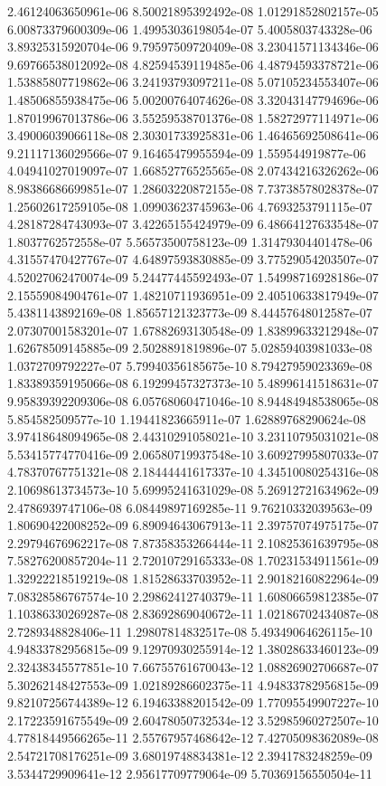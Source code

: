 2.46124063650961e-06	8.50021895392492e-08	1.01291852802157e-05	6.00873379600309e-06	1.49953036198054e-07	5.4005803743328e-06	3.89325315920704e-06	9.79597509720409e-08	3.23041571134346e-06	9.69766538012092e-08	4.82594539119485e-06	4.48794593378721e-06
1.53885807719862e-06	3.24193793097211e-08	5.07105234553407e-06	1.48506855938475e-06	5.00200764074626e-08	3.32043147794696e-06	1.87019967013786e-06	3.55259538701376e-08	1.58272977114971e-06	3.49006039066118e-08	2.30301733925831e-06	1.46465692508641e-06
9.21117136029566e-07	9.16465479955594e-09	1.559544919877e-06	4.04941027019097e-07	1.66852776525565e-08	2.07434216326262e-06	8.98386686699851e-07	1.28603220872155e-08	7.73738578028378e-07	1.25602617259105e-08	1.09903623745963e-06	4.7693253791115e-07
4.28187284743093e-07	3.42265155424979e-09	6.48664127633548e-07	1.8037762572558e-07	5.56573500758123e-09	1.31479304401478e-06	4.31557470427767e-07	4.64897593830885e-09	3.77529054203507e-07	4.52027062470074e-09	5.24477445592493e-07	1.54998716928186e-07
2.15559084904761e-07	1.48210711936951e-09	2.40510633817949e-07	5.4381143892169e-08	1.85657121323773e-09	8.44457648012587e-07	2.07307001583201e-07	1.67882693130548e-09	1.83899633212948e-07	1.62678509145885e-09	2.5028891819896e-07	5.02859403981033e-08
1.0372709792227e-07	5.79940356185675e-10	8.79427959023369e-08	1.83389359195066e-08	6.19299457327373e-10	5.48996141518631e-07	9.95839392209306e-08	6.05768060471046e-10	8.94484948538065e-08	5.854582509577e-10	1.19441823665911e-07	1.62889768290624e-08
3.97418648094965e-08	2.44310291058021e-10	3.23110795031021e-08	5.53415774770416e-09	2.06580719937548e-10	3.60927995807033e-07	4.78370767751321e-08	2.18444441617337e-10	4.34510080254316e-08	2.10698613734573e-10	5.69995241631029e-08	5.26912721634962e-09
2.4786939747106e-08	6.08449897169285e-11	9.76210332039563e-09	1.80690422008252e-09	6.89094643067913e-11	2.39757074975175e-07	2.29794676962217e-08	7.87358353266444e-11	2.10825361639795e-08	7.58276200857204e-11	2.72010729165333e-08	1.70231534911561e-09
1.32922218519219e-08	1.81528633703952e-11	2.90182160822964e-09	7.08328586767574e-10	2.29862412740379e-11	1.60806659812385e-07	1.10386330269287e-08	2.83692869040672e-11	1.02186702434087e-08	2.7289348828406e-11	1.29807814832517e-08	5.49349064626115e-10
4.94833782956815e-09	9.12970930255914e-12	1.38028633460123e-09	2.32438345577851e-10	7.66755761670043e-12	1.08826902706687e-07	5.30262148427553e-09	1.02189286602375e-11	4.94833782956815e-09	9.82107256744389e-12	6.19463388201542e-09	1.77095549907227e-10
2.17223591675549e-09	2.60478050732534e-12	3.52985960272507e-10	4.77818449566265e-11	2.55767957468642e-12	7.42705098362089e-08	2.54721708176251e-09	3.68019748834381e-12	2.3941783248259e-09	3.5344729909641e-12	2.95617709779064e-09	5.70369156550504e-11
